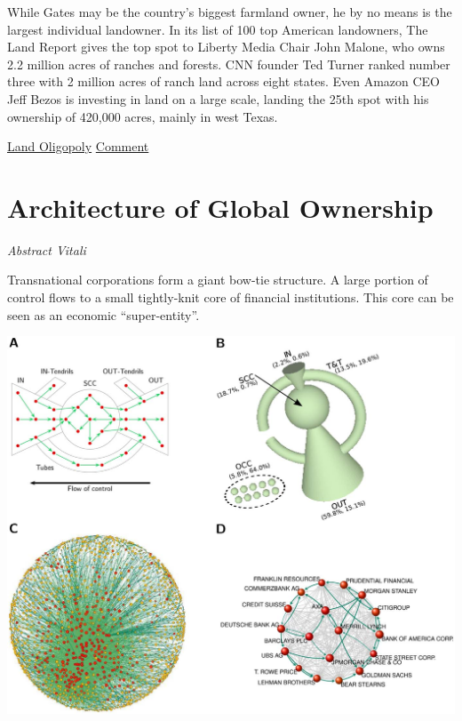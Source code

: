 \documentclass[
]{book}
\begin{document}
While Gates may be the country's biggest farmland owner,
he by no means is the largest individual landowner.
In its list of 100 top American landowners,
The Land Report gives the top spot to Liberty Media Chair John Malone,
who owns 2.2 million acres of ranches and forests.
CNN founder Ted Turner ranked number three with 2 million acres of ranch land
across eight states.
Even Amazon CEO Jeff Bezos is investing in land on a large scale,
landing the 25th spot with his ownership of 420,000 acres,
mainly in west Texas.

\href{https://www.forbes.com/sites/arielshapiro/2021/01/14/americas-biggest-owner-of-farmland-is-now-bill-gates-bezos-turner/}{Land Oligopoly}
\href{https://www.theguardian.com/commentisfree/2021/apr/05/bill-gates-climate-crisis-farmland}{Comment}

\hypertarget{architecture-of-global-ownership}{%
\section{Architecture of Global Ownership}\label{architecture-of-global-ownership}}

\emph{Abstract Vitali}

Transnational corporations form a giant bow-tie structure.
A large portion of control flows to a small tightly-knit core of financial institutions.
This core can be seen as an economic ``super-entity''.

\includegraphics{fig/Vitali_2D.png}
\end{document}
